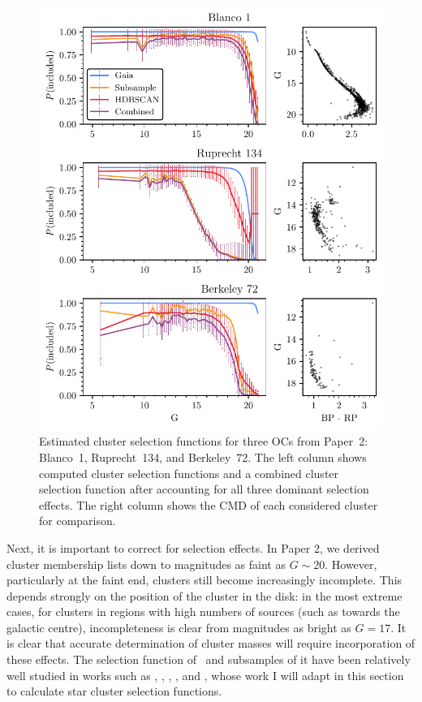 \begin{figure}[p]
    \centering
    \includegraphics[width=\textwidth]{fig/c4/mass_selection_functions.pdf}
    \caption[Estimated cluster selection functions for three OCs from Paper~2: Blanco~1, Ruprecht~134, and Berkeley~72]{Estimated cluster selection functions for three OCs from Paper~2: Blanco~1, Ruprecht~134, and Berkeley~72. The left column shows computed cluster selection functions and a combined cluster selection function after accounting for all three dominant selection effects. The right column shows the CMD of each considered cluster for comparison.}
    \label{fig:dynamics:masses:selection_effects}
\end{figure}

Next, it is important to correct for selection effects. In Paper 2, we derived cluster membership lists down to magnitudes as faint as $G\sim20$. However, particularly at the faint end, clusters still become increasingly incomplete. This depends strongly on the position of the cluster in the disk: in the most extreme cases, for clusters in regions with high numbers of sources (such as towards the galactic centre), incompleteness is clear from magnitudes as bright as $G=17$. It is clear that accurate determination of cluster masses will require incorporation of these effects. The selection function of \gaia\ and subsamples of it have been relatively well studied in works such as \cite{boubert_completeness_2020,boubert_completeness_2020-1}, \cite{boubert_completeness_2020-1}, \cite{rix_selection_functions_2021}, \cite{cantat-gaudin_empirical_model_2023}, and \cite{castro-ginard_estimating_selection_2023}, whose work I will adapt in this section to calculate star cluster selection functions.

